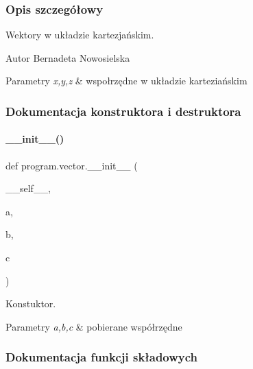 \subsubsection{Opis szczegółowy}
Wektory w układzie kartezjańskim. 

\begin{DoxyAuthor}{Autor}
Bernadeta Nowosielska 
\end{DoxyAuthor}

\begin{DoxyParams}{Parametry}
{\em x,y,z} & wspołrzędne w układzie karteziańskim \\
\hline
\end{DoxyParams}


\subsubsection{Dokumentacja konstruktora i destruktora}
\mbox{\label{classprogram_1_1vector_a541fba36d145fbe583e8a8dc6d58db4d}} 
\paragraph{\+\_\+\+\_\+init\+\_\+\+\_\+()}
{\footnotesize\ttfamily def program.\+vector.\+\_\+\+\_\+init\+\_\+\+\_\+ (\begin{DoxyParamCaption}\item[{}]{\+\_\+\+\_\+self\+\_\+\+\_\+,  }\item[{}]{a,  }\item[{}]{b,  }\item[{}]{c }\end{DoxyParamCaption})}



Konstuktor. 


\begin{DoxyParams}{Parametry}
{\em a,b,c} & pobierane współrzędne \\
\hline
\end{DoxyParams}


\subsubsection{Dokumentacja funkcji składowych}
\mbox{\label{classprogram_1_1vector_a05d9e5b8d70eec5ad26b841c3f9c148d}} 
